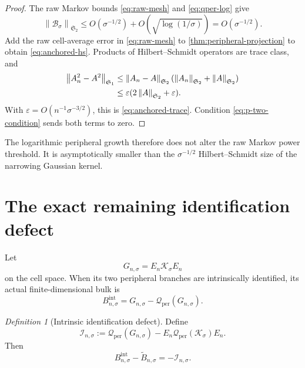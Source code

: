 \documentclass[11pt]{article}
\theoremstyle{remark}
\newtheorem{definition}[theorem]{Definition}
\newcommand{\cK}{\mathcal K}
\newcommand{\cB}{\mathcal B}
\newcommand{\cQ}{\mathcal Q}
\newcommand{\cI}{\mathcal I}
\newcommand{\norm}[1]{\left\lVert#1\right\rVert}
\newcommand{\HS}{\mathfrak S_2}
\newcommand{\TC}{\mathfrak S_1}
\begin{document}
\begin{proof}
The raw Markov bounds \eqref{eq:raw-mesh} and
\eqref{eq:qper-log} give
\[
 \norm{\cB_\sigma}_{\HS}
 \le O(\sigma^{-1/2})+O(\sqrt{\log(1/\sigma)})
 =O(\sigma^{-1/2}).
\]
Add the raw cell-average error in \eqref{eq:raw-mesh} to
\cref{thm:peripheral-projection} to obtain \eqref{eq:anchored-hs}.
Products of Hilbert--Schmidt operators are trace class, and
\begin{align}
 \norm{A_n^2-A^2}_{\TC}
 &\le\norm{A_n-A}_{\HS}
       (\norm{A_n}_{\HS}+\norm A_{\HS})
 \notag\\
 &\le\varepsilon(2\norm A_{\HS}+\varepsilon).
 \label{eq:hs-product}
\end{align}
With $\varepsilon=O(n^{-1}\sigma^{-3/2})$, this is
\eqref{eq:anchored-trace}.  Condition \eqref{eq:p-two-condition} sends both
terms to zero.
\end{proof}

The logarithmic peripheral growth therefore does not alter the raw Markov
power threshold.  It is asymptotically smaller than the
$\sigma^{-1/2}$ Hilbert--Schmidt size of the narrowing Gaussian kernel.

\section{The exact remaining identification defect}
\label{sec:identification}

Let
\begin{equation}
 G_{n,\sigma}=E_n\cK_\sigma E_n
 \label{eq:galerkin-markov}
\end{equation}
on the cell space.  When its two peripheral branches are intrinsically
identified, its actual finite-dimensional bulk is
\begin{equation}
 B_{n,\sigma}^{\mathrm{int}}
 =G_{n,\sigma}-\cQ_{\mathrm{per}}(G_{n,\sigma}).
 \label{eq:intrinsic-discrete-bulk}
\end{equation}

\begin{definition}[Intrinsic identification defect]
\label{def:identification}
Define
\begin{equation}
 \cI_{n,\sigma}
 :=\cQ_{\mathrm{per}}(G_{n,\sigma})
   -E_n\cQ_{\mathrm{per}}(\cK_\sigma)E_n.
 \label{eq:identification-defect}
\end{equation}
Then
\begin{equation}
 B_{n,\sigma}^{\mathrm{int}}-\widetilde B_{n,\sigma}
 =-\cI_{n,\sigma}.
 \label{eq:identification-identity}
\end{equation}
\end{definition}
\end{document}
